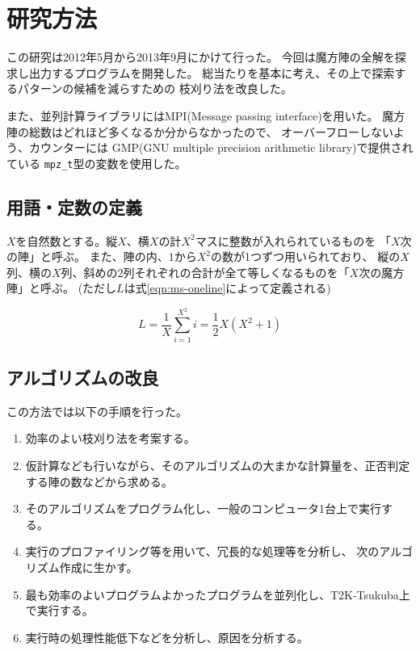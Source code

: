 \section{研究方法}
この研究は2012年5月から2013年9月にかけて行った。
今回は魔方陣の全解を探求し出力するプログラムを開発した。
総当たりを基本に考え、その上で探索するパターンの候補を減らすための
枝刈り法を改良した。

また、並列計算ライブラリにはMPI(Message passing interface)を用いた。
魔方陣の総数はどれほど多くなるか分からなかったので、
オーバーフローしないよう、カウンターには
GMP(GNU multiple precision arithmetic library)で提供されている
{\tt mpz\_t}型の変数を使用した。

\subsection{用語・定数の定義}
$X$を自然数とする。縦$X$、横$X$の計$X^2$マスに整数が入れられているものを
「$X$次の陣」と呼ぶ。
また、陣の内、$1$から$X^2$の数が1つずつ用いられており、
縦の$X$列、横の$X$列、斜めの$2$列それぞれの合計が全て等しくなるものを「$X$次の魔方陣」と呼ぶ。
(ただし$L$は式\ref{eqn:ms-oneline}によって定義される)

\begin{equation} \label{eqn:ms-oneline}
L=\frac{1}{X} \sum_{i=1}^{X^2}i = \frac{1}{2} X(X^2+1)
\end{equation}


\subsection{アルゴリズムの改良}
この方法では以下の手順を行った。
\begin{enumerate}
	\item 効率のよい枝刈り法を考案する。
	\item 仮計算なども行いながら、そのアルゴリズムの大まかな計算量を、正否判定する陣の数などから求める。
	\item そのアルゴリズムをプログラム化し、一般のコンピュータ1台上で実行する。
	\item 実行のプロファイリング等を用いて、冗長的な処理等を分析し、
	 	次のアルゴリズム作成に生かす。
	\item 最も効率のよいプログラムよかったプログラムを並列化し、T2K-Tsukuba上で実行する。
	\item 実行時の処理性能低下などを分析し、原因を分析する。
\end{enumerate}


